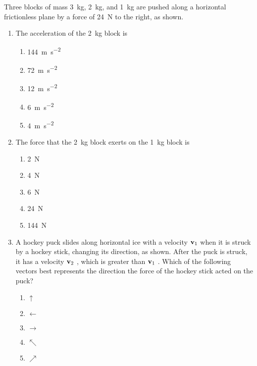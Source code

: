 \documentclass{../../oss-apphys}
\begin{document}
\begin{multicols}{2}
  Three blocks of mass \SI{3}{\kilo\gram}, \SI{2}{\kilo\gram}, and
  \SI{1}{\kilo\gram} are pushed along a horizontal frictionless plane by a
  force of \SI{24}{\newton} to the right, as shown.
  \begin{center}
  \end{center}
  \begin{enumerate}[resume,leftmargin=18pt]
  \item The acceleration of the \SI{2}{\kilo\gram} block is
    \begin{enumerate}[noitemsep,topsep=0pt,leftmargin=18pt,label=(\Alph*)]
    \item\SI{144}{\metre\per\second^2}
    \item\SI{72 }{\metre\per\second^2}
    \item\SI{12 }{\metre\per\second^2}
    \item\SI{6  }{\metre\per\second^2}
    \item\SI{4  }{\metre\per\second^2}
    \end{enumerate}

  \item The force that the \SI{2}{\kilo\gram} block exerts on the
    \SI{1}{\kilo\gram} block is
    \begin{enumerate}[noitemsep,topsep=0pt,leftmargin=18pt,label=(\Alph*)]
    \item \SI{2}{\newton}
    \item \SI{4}{\newton}
    \item \SI{6}{\newton}
    \item \SI{24}{\newton}
    \item \SI{144}{\newton}
    \end{enumerate}

  \item A hockey puck slides along horizontal ice with a velocity $\mathbf{v}_1$
    when it is struck by a hockey stick, changing its direction, as shown.
    After the puck is struck, it has a velocity $\mathbf{v}_2$ , which is greater
    than $\mathbf{v}_1$ . Which of the following vectors best represents the
    direction the force of the hockey stick acted on the puck?
    \begin{center}
    \end{center}
    \begin{enumerate}[noitemsep,topsep=0pt,leftmargin=18pt,label=(\Alph*)]
    \item$\uparrow$
    \item$\leftarrow$
    \item$\rightarrow$
    \item$\nwarrow$
    \item$\nearrow$
    \end{enumerate}
    \columnbreak
    

\end{enumerate}
\end{multicols}
\end{document}
